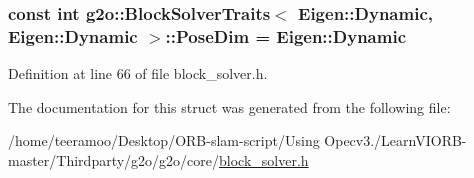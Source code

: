 \subsubsection[{\texorpdfstring{Pose\+Dim}{PoseDim}}]{\setlength{\rightskip}{0pt plus 5cm}const int {\bf g2o\+::\+Block\+Solver\+Traits}$<$ Eigen\+::\+Dynamic, Eigen\+::\+Dynamic $>$\+::Pose\+Dim = Eigen\+::\+Dynamic\hspace{0.3cm}{\ttfamily [static]}}\hypertarget{structg2o_1_1BlockSolverTraits_3_01Eigen_1_1Dynamic_00_01Eigen_1_1Dynamic_01_4_a04a2cc2de80563b4b21f815150c3b0ec}{}\label{structg2o_1_1BlockSolverTraits_3_01Eigen_1_1Dynamic_00_01Eigen_1_1Dynamic_01_4_a04a2cc2de80563b4b21f815150c3b0ec}


Definition at line 66 of file block\+\_\+solver.\+h.



The documentation for this struct was generated from the following file\+:\begin{DoxyCompactItemize}
\item 
/home/teeramoo/\+Desktop/\+O\+R\+B-\/slam-\/script/\+Using Opecv3./\+Learn\+V\+I\+O\+R\+B-\/master/\+Thirdparty/g2o/g2o/core/\hyperlink{block__solver_8h}{block\+\_\+solver.\+h}\end{DoxyCompactItemize}
